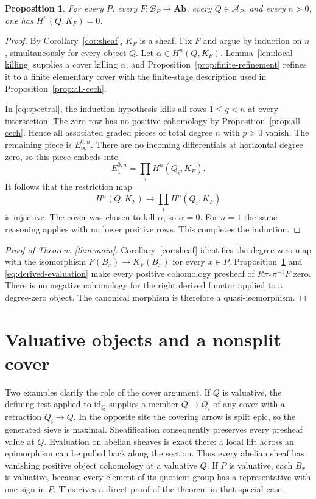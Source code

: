 \documentclass[11pt]{article}
\newtheorem{proposition}[theorem]{Proposition}
\theoremstyle{definition}
\theoremstyle{remark}
\newcommand{\Ab}{\mathbf{Ab}}
\newcommand{\cA}{\mathcal A}
\newcommand{\cB}{\mathcal B}
\begin{document}
\begin{proposition}\label{prop:acyclic}
For every $P$, every $F:\cB_P\to\Ab$, every $Q\in\cA_P$, and every $n>0$, one has $H^n(Q,K_F)=0$.
\end{proposition}

\begin{proof}
By Corollary~\ref{cor:sheaf}, $K_F$ is a sheaf. Fix $F$ and argue by induction on $n$, simultaneously for every object $Q$. Let $\alpha\in H^n(Q,K_F)$. Lemma~\ref{lem:local-killing} supplies a cover killing $\alpha$, and Proposition~\ref{prop:finite-refinement} refines it to a finite elementary cover with the finite-stage description used in Proposition~\ref{prop:all-cech}.

In \eqref{eq:spectral}, the induction hypothesis kills all rows $1\leq q<n$ at every intersection. The zero row has no positive cohomology by Proposition~\ref{prop:all-cech}. Hence all associated graded pieces of total degree $n$ with $p>0$ vanish. The remaining piece is $E_\infty^{0,n}$. There are no incoming differentials at horizontal degree zero, so this piece embeds into
\[
 E_1^{0,n}=\prod_i H^n(Q_i,K_F).
\]
It follows that the restriction map
\[
 H^n(Q,K_F)\longrightarrow\prod_iH^n(Q_i,K_F)
\]
is injective. The cover was chosen to kill $\alpha$, so $\alpha=0$. For $n=1$ the same reasoning applies with no lower positive rows. This completes the induction.
\end{proof}

\begin{proof}[Proof of Theorem~\ref{thm:main}]
Corollary~\ref{cor:sheaf} identifies the degree-zero map with the isomorphism $F(B_x)\to K_F(B_x)$ for every $x\in P$. Proposition~\ref{prop:acyclic} and \eqref{eq:derived-evaluation} make every positive cohomology presheaf of $R\pi_*\pi^{-1}F$ zero. There is no negative cohomology for the right derived functor applied to a degree-zero object. The canonical morphism is therefore a quasi-isomorphism.
\end{proof}

\section{Valuative objects and a nonsplit cover}


Two examples clarify the role of the cover argument. If $Q$ is valuative, the defining test applied to $\mathrm{id}_Q$ supplies a member $Q\to Q_i$ of any cover with a retraction $Q_i\to Q$. In the opposite site the covering arrow is split epic, so the generated sieve is maximal. Sheafification consequently preserves every presheaf value at $Q$. Evaluation on abelian sheaves is exact there: a local lift across an epimorphism can be pulled back along the section. Thus every abelian sheaf has vanishing positive object cohomology at a valuative $Q$. If $P$ is valuative, each $B_x$ is valuative, because every element of its quotient group has a representative with one sign in $P$. This gives a direct proof of the theorem in that special case.
\end{document}
